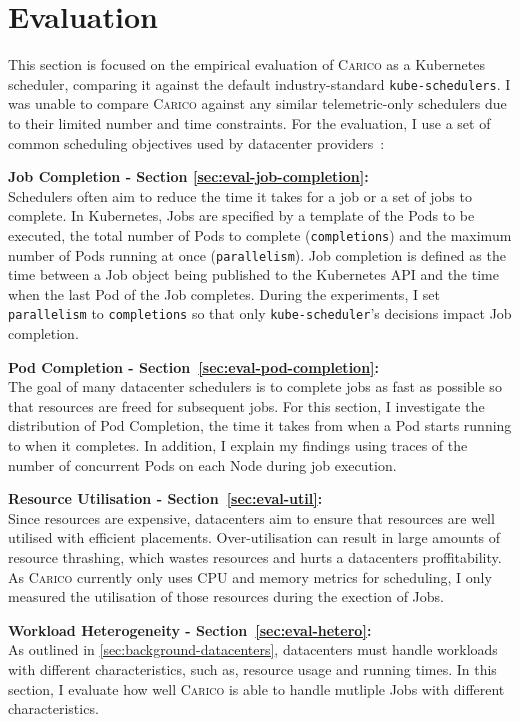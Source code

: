 \chapter{Evaluation}

This section is focused on the empirical evaluation of \textsc{Carico} as a
Kubernetes scheduler, comparing it against the default industry-standard
\texttt{kube-schedulers}. I was unable to compare \textsc{Carico} against any
similar telemetric-only schedulers due to their limited number and time
constraints. For the evaluation, I use a set of common scheduling objectives
used by datacenter providers~\cite{thesis}:

\textbf{Job Completion - Section \ref{sec:eval-job-completion}:}\\
Schedulers often aim to reduce the time it takes for a job or a set of jobs to
complete. In Kubernetes, Jobs are specified by a template of the Pods to be
executed, the total number of Pods to complete (\texttt{completions}) and the
maximum number of Pods running at once (\texttt{parallelism}). Job completion
is defined as the time between a Job object being published to the Kubernetes
API and the time when the last Pod of the Job completes. During the
experiments, I set \texttt{parallelism} to \texttt{completions} so that only
\texttt{kube-scheduler}'s decisions impact Job completion.

\textbf{Pod Completion - Section~\ref{sec:eval-pod-completion}:}\\
The goal of many datacenter schedulers is to complete jobs as fast as possible
so that resources are freed for subsequent jobs. For this section, I
investigate the distribution of Pod Completion, the time it takes from when a
Pod starts running to when it completes. In addition, I explain my findings
using traces of the number of concurrent Pods on each Node during job
execution.

\textbf{Resource Utilisation - Section~\ref{sec:eval-util}:}\\
Since resources are expensive, datacenters aim to ensure that resources are
well utilised with efficient placements. Over-utilisation can result in large
amounts of resource thrashing, which wastes resources and hurts a datacenters
proffitability. As \textsc{Carico} currently only uses CPU and memory metrics
for scheduling, I only measured the utilisation of those resources during the
exection of Jobs.

\textbf{Workload Heterogeneity - Section~\ref{sec:eval-hetero}:}\\
As outlined in \ref{sec:background-datacenters}, datacenters must handle
workloads with different characteristics, such as, resource usage and running
times. In this section, I evaluate how well \textsc{Carico} is able to handle
mutliple Jobs with different characteristics.

